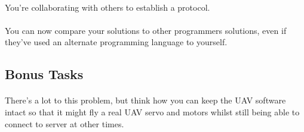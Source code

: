 \documentclass[11pt]{book}
\begin{document}
\paragraph{} You're collaborating with others to establish a protocol.

\paragraph{} You can now compare your solutions to other programmers solutions, even if they've used an alternate programming language to yourself.

\subsection{Bonus Tasks}

\paragraph{} There's a lot to this problem, but think how you can keep the UAV software intact so that it might fly a real UAV servo and motors whilst still being able to connect to server at other times.
\end{document}

